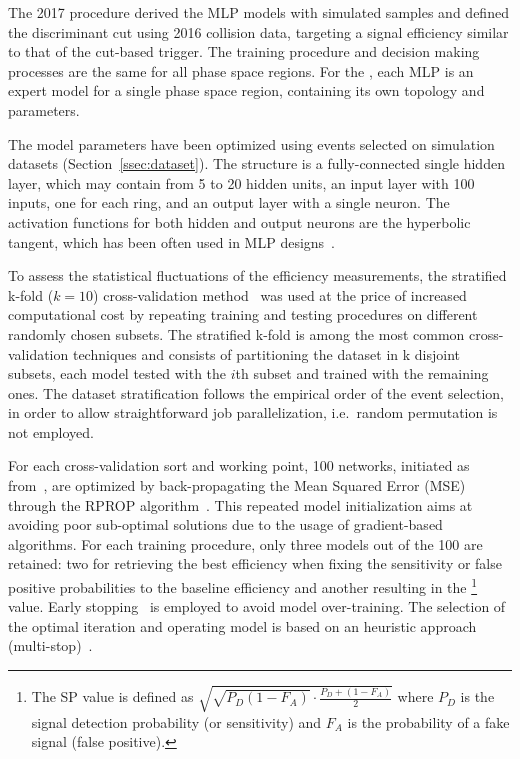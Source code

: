 The 2017 procedure derived the MLP models with simulated samples and defined the discriminant cut using 2016 collision data, targeting a signal efficiency similar to that of the cut-based trigger. The training procedure and decision making processes are the same for all phase space regions. For the \rnn{}, each MLP is an expert model for a single phase space region, containing its own topology and parameters.

The model parameters have been optimized using events selected on simulation datasets (Section~\ref{ssec:dataset}). 
The structure is a fully-connected single hidden layer, which may contain from 5 to 20 hidden units, an input layer with 100 inputs, one for each ring, and an output layer with a single neuron. 
The activation functions for both hidden and output neurons are the hyperbolic tangent, which has been often used in MLP designs~\cite{haykin_2008}. 

To assess the statistical fluctuations of the efficiency measurements, the stratified k-fold ($k=10$) cross-validation method~\cite{haykin_2008} was used at the price of increased computational cost by repeating training and testing procedures on different randomly chosen subsets. 
The stratified k-fold is among the most common cross-validation techniques and consists of partitioning the dataset in k disjoint subsets, each model tested with the $i$th subset and trained with the remaining ones. The dataset stratification follows the empirical order of the event selection, in order to allow straightforward job parallelization, i.e.\ random permutation is not employed. 

For each cross-validation sort and working point, 100 networks, initiated as from~\cite{initnw}, are optimized by back-propagating the Mean Squared Error (MSE) through the RPROP algorithm~\cite{rprop}. This repeated model initialization aims at avoiding poor sub-optimal solutions due to the usage of gradient-based algorithms.
For each training procedure, only three models out of the 100 are retained: two for retrieving the best efficiency when fixing the sensitivity or false positive probabilities to the baseline \fastcalo{} efficiency and another resulting in the \spmax{}\footnote{The SP value is defined as $\sqrt{\sqrt{P_D(1-F_A)}\cdot\frac{P_D + (1-F_A)}{2}}$ where $P_D$ is the signal detection probability (or sensitivity) and $F_A$ is the probability of a fake signal (false positive).} value. Early stopping~\cite{haykin_2008} is employed to avoid model over-training. The selection of the optimal iteration and operating model is based on an heuristic approach (multi-stop)~\cite{Goodfellow2016}.


